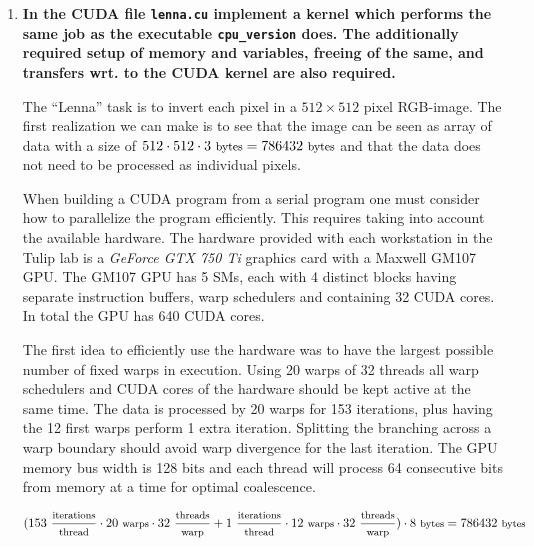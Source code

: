 \begin{enumerate}

\item \textbf{In the CUDA file \texttt{lenna.cu} implement a kernel which performs the same job as the executable \texttt{cpu\_version} does. The additionally required setup of memory and variables, freeing of the same, and transfers wrt. to the CUDA kernel are also required.}

The ``Lenna'' task is to invert each pixel in a $512 \times 512$ pixel RGB-image. The first realization we can make is to see that the image can be seen as array of data with a size of $512 \cdot 512 \cdot 3~\text{\footnotesize bytes} = 786432~\text{\footnotesize bytes}$ and that the data does not need to be processed as individual pixels.

When building a \ac{CUDA} program from a serial program one must consider how to parallelize the program efficiently. This requires taking into account the available hardware. The hardware provided with each workstation in the Tulip lab is a \textit{GeForce GTX 750 Ti} graphics card with a Maxwell GM107 \ac{GPU}. The GM107 \ac{GPU} has 5 \acp{SM}, each with 4 distinct blocks having separate instruction buffers, warp schedulers and containing 32 \ac{CUDA} cores. In total the \ac{GPU} has 640 \ac{CUDA} cores.

The first idea to efficiently use the hardware was to have the largest possible number of fixed warps in execution. Using 20 warps of 32 threads all warp schedulers and \ac{CUDA} cores of the hardware should be kept active at the same time. The data is processed by 20 warps for 153 iterations, plus having the 12 first warps perform 1 extra iteration. Splitting the branching across a warp boundary should avoid warp divergence for the last iteration. The \ac{GPU} memory bus width is 128 bits and each thread will process 64 consecutive bits from memory at a time for optimal coalescence.

\begin{displaymath}
(153~\frac{\text{\footnotesize iterations}}{\text{\footnotesize thread}} \cdot 20~\text{\footnotesize warps} \cdot 32~\frac{\text{\footnotesize threads}}{\text{\footnotesize warp}} + 1~\frac{\text{\footnotesize iterations}}{\text{\footnotesize thread}} \cdot 12~\text{\footnotesize warps} \cdot 32~\frac{\text{\footnotesize threads}}{\text{\footnotesize warp}}) \cdot 8~\text{\footnotesize bytes} = 786432~\text{\footnotesize bytes}
\end{displaymath}


\end{enumerate}
